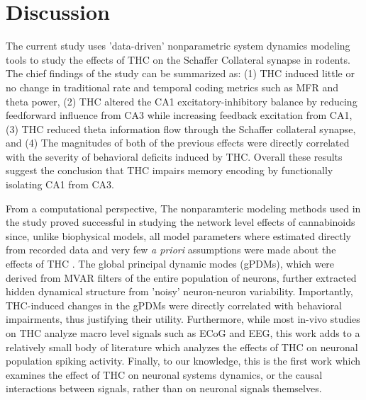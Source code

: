 \documentclass[11pt,a4paper,final]{article}
\begin{document}
\section{Discussion \label{disc}}

The current study uses 'data-driven' nonparametric system dynamics modeling tools to study the effects of THC on the Schaffer Collateral synapse in rodents.
The chief findings of the study can be summarized as:
(1) THC induced little or no change in traditional rate and temporal coding metrics such as MFR and theta power, 	
(2) THC altered the CA1 excitatory-inhibitory balance by reducing feedforward influence from CA3 while increasing feedback excitation from CA1,
(3) THC reduced theta information flow through the Schaffer collateral synapse,
and (4) The magnitudes of both of the previous effects were directly correlated with the severity of behavioral deficits induced by THC.
Overall these results suggest the conclusion that THC impairs memory encoding by functionally isolating CA1 from CA3.

From a computational perspective, The nonparamteric modeling methods used in the study proved successful in studying the network level effects of cannabinoids since, unlike biophysical models, all model parameters where estimated directly from recorded data and very few \textit{a priori} assumptions were made about the effects of THC \citep{marm04,song09par1,sandler15}.
The global principal dynamic modes (gPDMs), which were derived from MVAR filters of the entire population of neurons, further extracted hidden dynamical structure from 'noisy' neuron-neuron variability.
Importantly, THC-induced changes in the gPDMs were directly correlated with behavioral impairments, thus justifying their utility.
Furthermore, while most in-vivo studies on THC analyze macro level signals such as ECoG and EEG, this work adds to a relatively small body of literature which analyzes the effects of THC on neuronal population spiking activity.
Finally, to our knowledge, this is the first work which examines the effect of THC on neuronal systems dynamics, or the causal interactions between signals, rather than on neuronal signals themselves.
\end{document}
